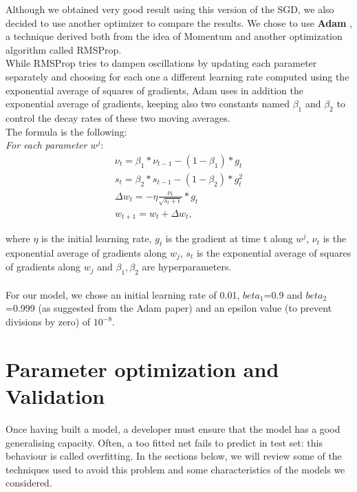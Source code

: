 \documentclass[12pt]{article}
\begin{document}
Although we obtained very good result using this version of the SGD, we also decided to use another optimizer to compare the results. We chose to use \textbf{Adam} \cite{kingma2014adam}, a technique derived both from the idea of Momentum and another optimization algorithm called RMSProp. \\
While RMSProp tries to dampen oscillations by updating each parameter separately and choosing for each one a different learning rate computed using the exponential average of squares of gradients, Adam uses in addition the exponential average of gradients, keeping also two constants named $\beta_{1}$ and $\beta_{2}$ to control the decay rates of these two moving averages. \\
The formula is the following: \\ 


\textit{For each parameter $w^{j}$}: 
\begin{align*}
\nu_{t}  = \beta_{1}  *  \nu_{t-1} - (1 - \beta_{1}) *g_{t} \\
s_{t} =  \beta_{2} * s_{t-1} - (1-\beta_{2}) * g_{t}^2\\
\Delta w_{t} = -\eta \frac{\nu_{t}}{\sqrt{s_{t} + \epsilon}}* g_{t}\\
w_{t+1} = w_{t} + \Delta w_{t},
\end{align*}

where $\eta$ is the initial learning rate, $g_{t}$ is the gradient at time t along $w^{j}$, $\nu_{t}$ is the exponential average of gradients along $w_{j}$, $s_{t}$ is the exponential average of squares of gradients along $w_{j}$ and $\beta_{1},\beta_{2}$ are hyperparameters. \\ \\
For our model, we chose an initial learning rate of 0.01, $beta_{1}$=0.9 and $beta_{2}$=0.999 (as suggested from the Adam paper) and an epsilon value (to prevent divisions by zero) of $10^{-8}$.

\newpage
\section{Parameter optimization and Validation}
Once having built a model, a developer must ensure that the model has a good generalising capacity. Often, a too fitted net fails to predict in test set: this behaviour is called overfitting.
In the sections below, we will review some of the techniques used to avoid this problem and some characteristics of the models we considered.
\end{document}
